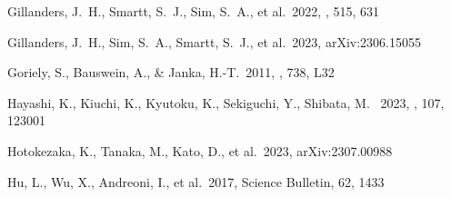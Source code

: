 \documentclass[twocolumn,twocolappendix]{aastex63}
\begin{document}
{\begin{thebibliography}{}
 Gillanders, J.~H., Smartt, S.~J., Sim, S.~A., et al.\ 2022, \mnras, 515, 631


 Gillanders, J.~H., Sim, S.~A., Smartt, S.~J., et al.\ 2023, arXiv:2306.15055




 Goriely, S., Bauswein, A., \& Janka, H.-T.\ 2011, \apjl, 738, L32





 Hayashi, K., Kiuchi, K., Kyutoku, K., Sekiguchi, Y., Shibata, M. \ 2023, \prd, 107, 123001












 Hotokezaka, K., Tanaka, M., Kato, D., et al.\ 2023, arXiv:2307.00988


 Hu, L., Wu, X., Andreoni, I., et al.\ 2017, Science Bulletin, 62, 1433





\end{thebibliography}}
\end{document}
